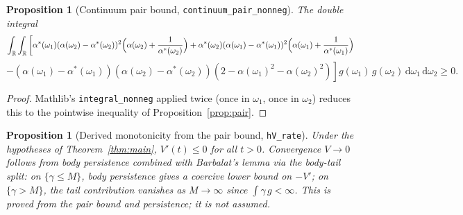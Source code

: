 \documentclass[11pt,a4paper]{article}
\newtheorem{proposition}[theorem]{Proposition}
\theoremstyle{definition}
\newcommand{\R}{\mathbb{R}}
\begin{document}
\begin{proposition}[Continuum pair bound, \texttt{continuum\_pair\_nonneg}]\label{prop:cpair}
The double integral
\[
\int_\R \int_\R \left[\alpha^*(\omega_1)(\alpha(\omega_2) - \alpha^*(\omega_2))^2\Bigl(\alpha(\omega_2) + \frac{1}{\alpha^*(\omega_2)}\Bigr) + \alpha^*(\omega_2)(\alpha(\omega_1) - \alpha^*(\omega_1))^2\Bigl(\alpha(\omega_1) + \frac{1}{\alpha^*(\omega_1)}\Bigr)\right.
\]
\[
\left. - (\alpha(\omega_1) - \alpha^*(\omega_1))(\alpha(\omega_2) - \alpha^*(\omega_2))(2 - \alpha(\omega_1)^2 - \alpha(\omega_2)^2)\right] g(\omega_1)\,g(\omega_2)\,\mathrm{d}\omega_1\,\mathrm{d}\omega_2 \geq 0.
\]
\end{proposition}

\begin{proof}
Mathlib's \texttt{integral\_nonneg} applied twice (once in $\omega_1$, once in $\omega_2$) reduces this to the pointwise inequality of Proposition~\ref{prop:pair}.
\end{proof}

\begin{proposition}[Derived monotonicity from the pair bound, \texttt{hV\_rate}]\label{prop:rate}
Under the hypotheses of Theorem~\ref{thm:main}, $V'(t) \leq 0$ for all $t > 0$. Convergence $V \to 0$ follows from body persistence combined with Barbalat's lemma via the body-tail split: on $\{\gamma \leq M\}$, body persistence gives a coercive lower bound on $-V'$; on $\{\gamma > M\}$, the tail contribution vanishes as $M \to \infty$ since $\int \gamma\,g < \infty$. This is \emph{proved} from the pair bound and persistence; it is not assumed.
\end{proposition}
\end{document}
